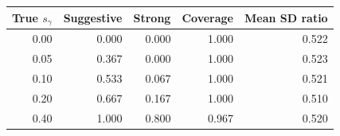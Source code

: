 \begin{tabular}{@{}rrrrr@{}}
\toprule
True $s_\gamma$ & Suggestive & Strong & Coverage & Mean SD ratio \\
\midrule
0.00 & 0.000 & 0.000 & 1.000 & 0.522 \\
0.05 & 0.367 & 0.000 & 1.000 & 0.523 \\
0.10 & 0.533 & 0.067 & 1.000 & 0.521 \\
0.20 & 0.667 & 0.167 & 1.000 & 0.510 \\
0.40 & 1.000 & 0.800 & 0.967 & 0.520 \\
\bottomrule
\end{tabular}
